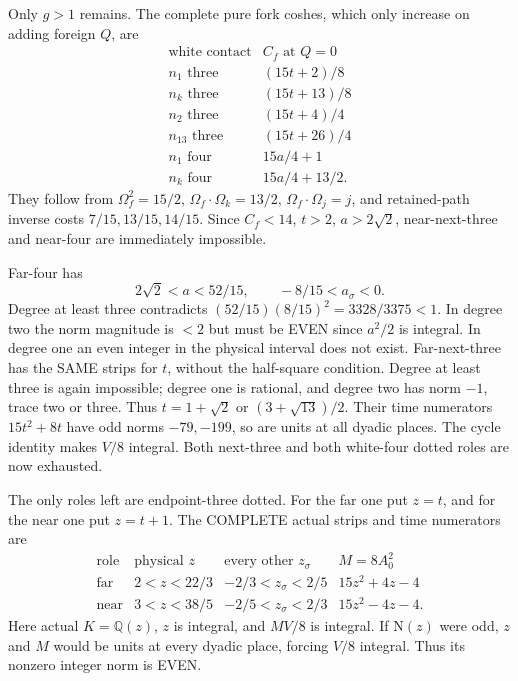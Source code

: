 Only \(g>1\) remains.
The complete pure fork coshes, which only increase
on adding foreign \(Q\), are
\[
\begin{array}{c|c}
 \text{white contact}&C_f\text{ at }Q=0\\ \hline
 n_1\text{ three}&(15t+2)/8\\
 n_k\text{ three}&(15t+13)/8\\
 n_2\text{ three}&(15t+4)/4\\
 n_{13}\text{ three}&(15t+26)/4\\
 n_1\text{ four}&15a/4+1\\
 n_k\text{ four}&15a/4+13/2 .
\end{array}
\]
They follow from
\(\Omega_f^2=15/2\),
\(\Omega_f\cdot\Omega_k=13/2\),
\(\Omega_f\cdot\Omega_j=j\),
and retained-path inverse costs
\(7/15,13/15,14/15\).
Since \(C_f<14\), \(t>2\), \(a>2\sqrt2\),
near-next-three and near-four are immediately impossible.

Far-four has
\[
            2\sqrt2<a<52/15,\qquad -8/15<a_\sigma<0.
\]
Degree at least three contradicts
\((52/15)(8/15)^2=3328/3375<1\).
In degree two the norm magnitude is \(<2\)
but must be EVEN since \(a^2/2\) is integral.
In degree one an even integer in the physical
interval does not exist.
Far-next-three has the SAME strips for \(t\),
without the half-square condition.
Degree at least three is again impossible;
degree one is rational, and degree two has norm
\(-1\), trace two or three.
Thus \(t=1+\sqrt2\) or \((3+\sqrt{13})/2\).
Their time numerators \(15t^2+8t\) have odd norms
\(-79,-199\), so are units at all dyadic places.
The cycle identity makes \(V/8\) integral.
Both next-three and both white-four dotted roles
are now exhausted.

The only roles left are endpoint-three dotted.
For the far one put \(z=t\), and for the near one
put \(z=t+1\).
The COMPLETE actual strips and time numerators are
\[
\begin{array}{c|c|c|c}
 \text{role}&\text{physical }z&\text{every other }z_\sigma&M=8A_0^2\\ \hline
 \text{far}&2<z<22/3&-2/3<z_\sigma<2/5&15z^2+4z-4\\
 \text{near}&3<z<38/5&-2/5<z_\sigma<2/3&15z^2-4z-4 .
\end{array}
\]
Here actual \(K=\mathbb Q(z)\), \(z\) is integral,
and \(MV/8\) is integral.
If \(\mathrm N(z)\) were odd, \(z\) and \(M\)
would be units at every dyadic place, forcing
\(V/8\) integral.
Thus its nonzero integer norm is EVEN.

